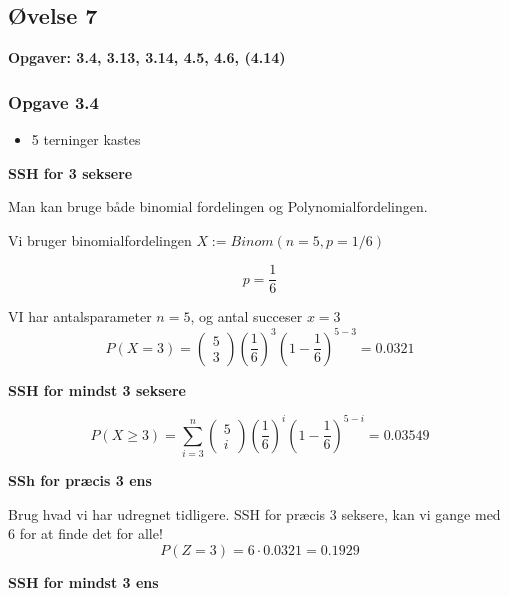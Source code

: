 \horizline

\subsection{Øvelse 7}

\textbf{Opgaver: 3.4, 3.13, 3.14, 4.5, 4.6, (4.14)}

\subsubsection{Opgave 3.4}

\begin{itemize}
    \item 5 terninger kastes
\end{itemize}

\textbf{SSH for 3 seksere}

Man kan bruge både binomial fordelingen og Polynomialfordelingen.

Vi bruger binomialfordelingen $X:=Binom(n = 5, p = 1/6)$


\begin{equation}
    p = \frac{1}{6}
\end{equation}

VI har antalsparameter $n=5$, og antal succeser $x=3$
\begin{equation}
    P(X = 3) = \begin{pmatrix}
    5 \\ 3 \end{pmatrix} \left(\frac{1}{6}\right)^3\left(1 - \frac{1}{6} \right)^{5-3} = 0.0321
\end{equation}

\textbf{SSH for mindst 3 seksere}

\begin{equation}
    P(X \geq 3) =  \sum_{i=3}^n \begin{pmatrix}
    5 \\ i \end{pmatrix} \left(\frac{1}{6}\right)^i\left(1 - \frac{1}{6} \right)^{5-i} = 0.03549
\end{equation}

\textbf{SSh for præcis 3 ens}


Brug hvad vi har udregnet tidligere. SSH for præcis 3 seksere, kan vi gange med 6 for at finde det for alle!
\begin{equation}
    P(Z=3) = 6 \cdot 0.0321 = 0.1929
\end{equation}


\textbf{SSH for mindst 3 ens}



